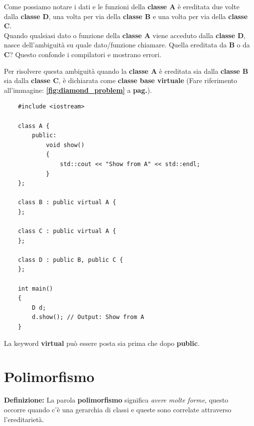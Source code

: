 \textsf{\small Come possiamo notare i dati e le funzioni della \textbf{classe A} è ereditata due volte dalla \textbf{classe D}, una volta per via della \textbf{classe B} e una volta per via della \textbf{classe C}.} \\

\textsf{\small Quando qualsiasi dato o funzione della \textbf{classe A} viene acceduto dalla \textbf{classe D}, nasce dell'ambiguità su quale dato/funzione chiamare. Quella ereditata da \textbf{B} o da \textbf{C}? Questo confonde i compilatori e mostrano errori.}

\textsf{\small Per risolvere questa ambiguità quando la \textbf{classe A} è ereditata sia dalla \textbf{classe B} sia dalla \textbf{classe C}, è dichiarata come \textbf{classe base virtuale} (Fare riferimento all'immagine: \textbf{\ref{fig:diamond_problem}} a \textbf{pag.\pageref{fig:diamond_problem}}).}

\begin{lstlisting}
	#include <iostream>
	
	class A {
		public:
			void show()
			{
				std::cout << "Show from A" << std::endl;
			}
	};

	class B : public virtual A {
	};

	class C : public virtual A {
	};

	class D : public B, public C {
	};

	int main()
	{
		D d;
		d.show(); // Output: Show from A
	}
\end{lstlisting}

\textsf{\small La keyword \textbf{virtual} può essere posta sia prima che dopo \textbf{public}.} \\



\section{Polimorfismo}

\textsf{\small \textbf{Definizione:} La parola \textbf{polimorfismo} significa \emph{avere molte forme}, questo occorre quando c'è una gerarchia di classi e queste sono correlate attraverso l'ereditarietà.} \\

